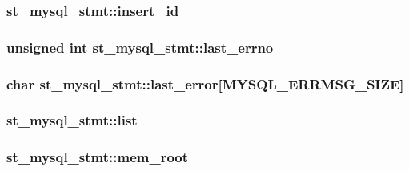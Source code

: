 \subsubsection[{insert\+\_\+id}]{ st\+\_\+mysql\+\_\+stmt\+::insert\+\_\+id}\label{structst__mysql__stmt_ae1412a9a6bacafb7daf66f5fc826b54f}
\hypertarget{structst__mysql__stmt_a58c9c8e23ee17b61de9804585fa3c9cd}{}
\subsubsection[{last\+\_\+errno}]{\setlength{\rightskip}{0pt plus 5cm}unsigned int st\+\_\+mysql\+\_\+stmt\+::last\+\_\+errno}\label{structst__mysql__stmt_a58c9c8e23ee17b61de9804585fa3c9cd}
\hypertarget{structst__mysql__stmt_a5aa67e24109cb953e09d788756802c9a}{}
\subsubsection[{last\+\_\+error}]{\setlength{\rightskip}{0pt plus 5cm}char st\+\_\+mysql\+\_\+stmt\+::last\+\_\+error\mbox{[}{\bf M\+Y\+S\+Q\+L\+\_\+\+E\+R\+R\+M\+S\+G\+\_\+\+S\+I\+Z\+E}\mbox{]}}\label{structst__mysql__stmt_a5aa67e24109cb953e09d788756802c9a}
\hypertarget{structst__mysql__stmt_aac96a0c9f7a07434da3d798f3b2ece87}{}
\subsubsection[{list}]{ st\+\_\+mysql\+\_\+stmt\+::list}\label{structst__mysql__stmt_aac96a0c9f7a07434da3d798f3b2ece87}
\hypertarget{structst__mysql__stmt_a292686a1de9fdbddc3963bcf20249cb0}{}
\subsubsection[{mem\+\_\+root}]{ st\+\_\+mysql\+\_\+stmt\+::mem\+\_\+root}\label{structst__mysql__stmt_a292686a1de9fdbddc3963bcf20249cb0}
\hypertarget{structst__mysql__stmt_a224349871acc052c72cfa86f5901c809}{}
